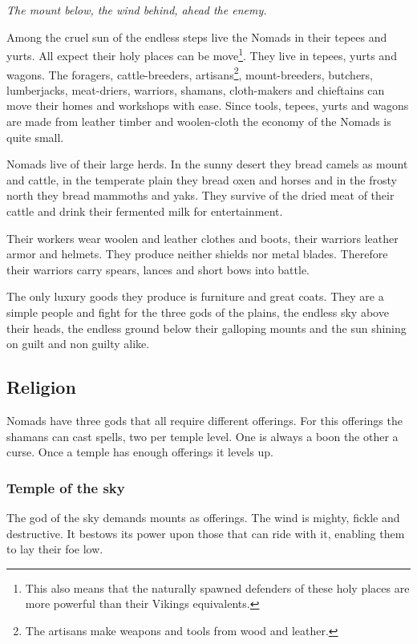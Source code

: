 \section{}\label{ch:Tribes:Nomads}

\begin{flushright}
	\emph{The mount below, the wind behind, ahead the enemy.}
\end{flushright}

Among the cruel sun of the endless steps live the \gls{Nomads} in their tepees
and yurts. All expect their holy places can be move\footnote{ This also means
	that the naturally spawned defenders of these holy places are more powerful
	than their \gls{Vikings} equivalents. }. They live in tepees, yurts and wagons.
The foragers, cattle-breeders, artisans\footnote{ The artisans make weapons and
	tools from wood and leather. }, mount-breeders, butchers, lumberjacks,
meat-driers, warriors, shamans, cloth-makers and chieftains can move their
homes and workshops with ease. Since tools, tepees, yurts and wagons are made
from leather timber and woolen-cloth the economy of the \gls{Nomads} is quite
small.

\Gls{Nomads} live of their large herds. In the sunny desert they bread camels as mount
and cattle, in the temperate plain they bread oxen and horses and in the frosty north
they bread mammoths and yaks.
They survive of the dried meat of their cattle and drink their fermented milk for
entertainment.

Their workers wear woolen and leather clothes and boots, their warriors leather
armor and helmets. They produce neither shields nor metal blades. Therefore
their warriors carry spears, lances and short bows into battle.

The only luxury goods they produce is furniture and great coats. They are a
simple people and fight for the three gods of the plains, the endless sky above
their heads, the endless ground below their galloping mounts and the sun
shining on guilt and non guilty alike.

\subsection{Religion}
\Gls{Nomads} have three gods that all require different offerings.
For this offerings the shamans can cast spells, two per temple level.
One is always a boon the other a curse.
Once a temple has enough offerings it levels up.

\subsubsection{Temple of the sky}
The god of the sky demands mounts as offerings. The wind is mighty, fickle and
destructive. It bestows its power upon those that can ride with it, enabling
them to lay their foe low.

